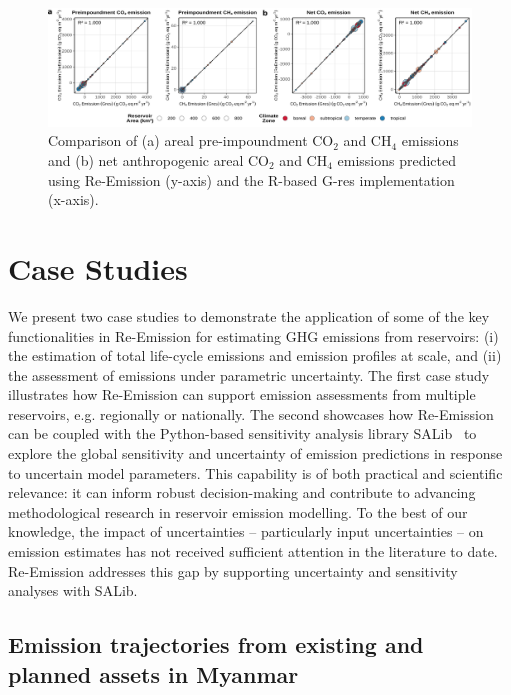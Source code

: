 \documentclass[final,1p,times]{elsarticle}
\begin{document}
\begin{figure}[ht]
    \centering
    \includegraphics[width=1.0\textwidth]{figures/comparison_plot_net_emissions.pdf}
    \caption{{Comparison of (a) areal pre-impoundment CO$_2$ and CH$_4$ emissions and (b) net anthropogenic areal CO$_2$ and CH$_4$ emissions predicted using Re-Emission (y-axis) and the R-based G-res implementation (x-axis).}}
    
    \label{fig:validation_plot_net_emissions}
\end{figure}

\section{Case Studies}
\label{sec:case_studies}

We present two case studies to demonstrate the application of some of the key functionalities in Re-Emission for estimating \ac{GHG} emissions from reservoirs: (i) the estimation of total life-cycle emissions and emission profiles at scale, and (ii) the assessment of emissions under parametric uncertainty.
The first case study illustrates how Re-Emission can support emission assessments from multiple reservoirs, e.g. regionally or nationally.
The second showcases how Re-Emission can be coupled with the Python-based sensitivity analysis library SALib~\cite{Iwanaga_Toward_SALib_2_0_2022} to explore the global sensitivity and uncertainty of emission predictions in response to uncertain model parameters.
This capability is of both practical and scientific relevance: it can inform robust decision-making and contribute to advancing methodological research in reservoir emission modelling. 
To the best of our knowledge, the impact of uncertainties -- particularly input uncertainties -- on emission estimates has not received sufficient attention in the literature to date. 
Re-Emission addresses this gap by supporting uncertainty and sensitivity analyses with SALib.

\subsection{Emission trajectories from existing and planned assets in Myanmar}
\label{subsec:myanmar}
\end{document}
